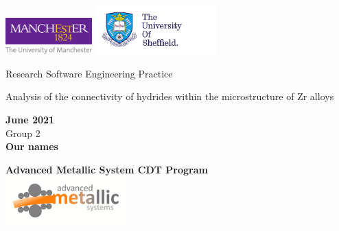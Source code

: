 \documentclass[12pt]{article}
\begin{document}
\onehalfspacing
\thispagestyle{empty} 
\begin{titlepage}
    \centering
    \includegraphics[width=0.25\textwidth]{uom_logo.pdf}
    \hspace{170}
    \includegraphics[width=0.35\textwidth]{Sheffield.pdf}
    \begin{center}
       \vspace*{4cm}
       {\LARGE Research Software Engineering Practice}
       \vspace{3cm}
    \begin{large}   
    

         
         \vspace{0.5cm}

        {\LARGE Analysis of the connectivity of hydrides within the microstructure of Zr alloys} \\

       \vspace{1.5cm}
        
        {\bf June 2021} \\
                
        
       \vspace{3 cm}
        Group 2 \\
       \textbf{Our names}\\

       \vfill
       \centering
       
        {\bf \large Advanced Metallic System CDT Program}\\
          
        \includegraphics[width=0.35\textwidth]{CDT.jpg}
        
    
    
    \end{large}  
   \end{center}
\end{titlepage}
\newpage 
\thispagestyle{plain} 
\end{document}
